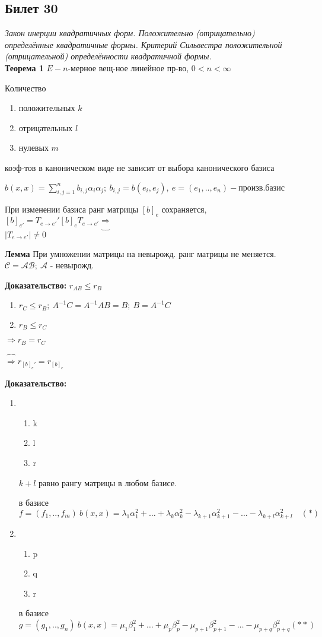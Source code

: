 \subsection{Билет 30}

\textit{Закон инерции квадратичных форм. Положительно (отрицательно) определённые квадратичные формы. Критерий Сильвестра положительной (отрицательной) определённости квадратичной формы.}\\

\textbf{Теорема 1} $E-n$-мерное вещ-ное линейное пр-во, $0 < n < \infty$

Количество 
\begin{enumerate}
 \item положительных $k$
 \item отрицательных $l$
 \item нулевых $m$
\end{enumerate} коэф-тов в каноническом виде не зависит от выбора канонического базиса

$b(x,x) = \sum\limits_{i,j=1}^n b_{i,j} \alpha_i \alpha_j;\ b_{i,j} = b(e_i, e_j),\ e=(e_1,..,e_n) - произв. базис$

При изменении базиса ранг матрицы $[b]_e$ сохраняется, \quad $[b]_{e'} = T_{e\to e'}' [b]_e T_{e \to e'} \underbrace{\Rightarrow} $\\$ |T_{e\to e'}| \ne 0$

\textbf{Лемма} При умножении матрицы на невырожд. ранг матрицы не меняется. $\mathcal{C} = \mathcal{AB};\ \mathcal{A}$ - невырожд.

\textbf{Доказательство: } $r_{AB} \le r_{B}$
\begin{enumerate}
 \item $r_{C} \le r_{B};\ A^{-1} C = A^{-1}AB = B;\ B = A^{-1}C$
 \item $r_{B} \le r_{C}$
\end{enumerate} $\Rightarrow r_B = r_C$

$\overbrace{\Rightarrow} r_{[b]_e'} = r_{[b]_e}$

\textbf{Доказательство: } 
\begin{enumerate}
 \item 
       \begin{enumerate}
        \item k
	\item l
	\item r
       \end{enumerate}
    $k+l$ равно рангу матрицы в любом базисе. 

    в базисе $f = (f_1,..,f_m)\ b(x,x) = \lambda_1 \alpha_1^2 + \ldots + \lambda_k \alpha_k^2 - \lambda_{k+1}\alpha_{k+1}^2 - \ldots - \lambda_{k+l}\alpha_{k+l}^2\quad (*)$
 \item 
      \begin{enumerate}
       \item p
       \item q
       \item r
      \end{enumerate}
    в базисе $g = (g_1,..,g_n )\  b(x,x) = \mu_1\beta_1^2 + \ldots + \mu_p\beta_p^2 - \mu_{p+1}\beta_{p+1}^2 - \ldots - \mu_{p+q} \beta_{p+q}^2 (**)$ 
\end{enumerate}

